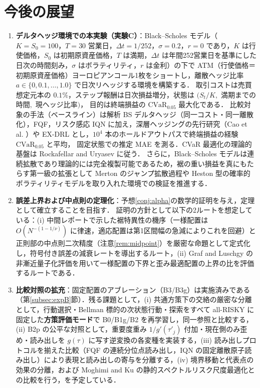 \documentclass[a4paper,10pt]{jsarticle}
\theoremstyle{definition}
\newcommand{\CVaR}{\mathrm{CVaR}}
\begin{document}
\section{今後の展望}
\label{sec:future}
\begin{enumerate}
  \item \textbf{デルタヘッジ環境での本実験（実験C）}：Black--Scholes モデル（$K=S_0=100$，$T=30$ 営業日，$\Delta t=1/252$，$\sigma=0.2$，$r=0$ であり，$K$ は行使価格，$S_0$ は初期原資産価格，$T$ は満期，$\Delta t$ は年間252営業日を基準にした日次の時間刻み，$\sigma$ はボラティリティ，$r$ は金利）の下で
  ATM（行使価格＝初期原資産価格）ヨーロピアンコール1枚をショートし，離散ヘッジ比率 $a\in\{0,0.1,\dots,1.0\}$ で日次リヘッジする環境を構築する．
  取引コストは売買想定元本の $0.1\%$，ステップ報酬は日次損益増分，状態は $(S_t/K,$ 満期までの時間$,$ 現ヘッジ比率$)$，
  目的は終端損益の $\CVaR_{0.05}$ 最大化である．
  比較対象の手法（ベースライン）は解析 BS デルタヘッジ（同一コスト・同一離散化），FQF，リスク感応 IQN に加え，深層ヘッジングの先行研究（Cao et al. \cite{cao2021deep,cao2023gamma}）や EX-DRL \cite{malekzadeh2024exdrl} とし，$10^4$ 本のホールドアウトパスで終端損益の経験 $\CVaR_{0.05}$ と平均，
  固定状態での推定 MAE を測る．CVaR 最適化の理論的基盤は Rockafellar and Uryasev \cite{rockafellar2000cvar} に従う．
  さらに，Black--Scholes モデルは連続拡散であり理論的には完全複製可能であるため，裾の重い損益を真にもたらす第一級の拡張として Merton のジャンプ拡散過程や Heston 型の確率的ボラティリティモデルを取り入れた環境での検証を推進する．
  \item \textbf{誤差上界および中点則の定理化}：予想\ref{conj:alpha}の数学的証明を与え，定理として確立することを目指す．
  証明の方針として以下の2ルートを想定している：(i) 中間レポートで示した裾特異性の機序（一様配置は $O(N^{-(1-1/\nu)})$ に律速，適応配置は第1区間幅の急減によりこれを回避）と正則部の中点則二次精度（注意\ref{rem:midpoint}）を厳密な命題として定式化し，符号付き誤差の減衰レートを導出するルート，(ii) Graf and Luschgy \cite{graf2000quantization} の非漸近量子化評価を用いて一様配置の下界と歪み最適配置の上界の比を評価するルートである．
  \item \textbf{比較対照の拡充}：固定配置のアブレーション（B3/B3g）は実施済みである（第\ref{subsec:expB}節）．残る課題として，(i) 共通方策下の交絡の厳密な分離として，行動選択・Bellman 標的の次状態行動・探索をすべて all-RISKY に固定した\textbf{方策評価モード}で B0/B1g/B2 を再学習し，同一参照と比較する，(ii) B2p の公平な対照として，重要度重み $1/g'(\tau'_j)$ 付加・現在側のみ歪め・読み出しを $g(\tau)$ に写す逆変換の各変種を実装する，(iii) 読み出しプロトコルを揃えた比較（FQF の連続分位点読み出し，IQN の固定離散原子読み出し）により表現と読み出しの寄与を分離する，(iv) 境界移動と代表点の効果の分離，および Moghimi and Ku \cite{moghimi2025beyond} の静的スペクトルリスク尺度最適化との比較を行う，を予定している．

\end{enumerate}
\end{document}
